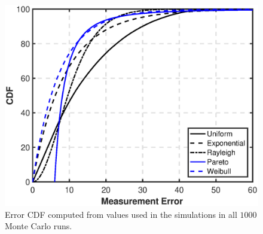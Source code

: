 \documentclass[journal]{IEEEtran}
\begin{document}
\begin{figure}[!t] 
	\centering
	\includegraphics[width=\columnwidth]{cdf_error}
	\caption{Error CDF computed from values used in the simulations in all $1000$ Monte Carlo runs.}		
	\label{fig:cdf_error}
\end{figure}
%
%
\end{document}
